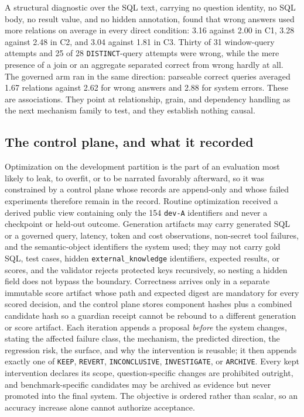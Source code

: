 A structural diagnostic over the SQL text, carrying no question identity, no SQL
body, no result value, and no hidden annotation, found that wrong answers used
more relations on average in every direct condition: 3.16 against 2.00 in C1,
3.28 against 2.48 in C2, and 3.04 against 1.81 in C3. Thirty of 31 window-query
attempts and 25 of 28 \texttt{DISTINCT}-query attempts were wrong, while the mere
presence of a join or an aggregate separated correct from wrong hardly at all.
The governed arm ran in the same direction: parseable correct queries averaged
1.67 relations against 2.62 for wrong answers and 2.88 for system errors. These
are associations. They point at relationship, grain, and dependency handling as
the next mechanism family to test, and they establish nothing causal.

\subsection{The control plane, and what it recorded}

Optimization on the development partition is the part of an evaluation most
likely to leak, to overfit, or to be narrated favorably afterward, so it was
constrained by a control plane whose records are append-only and whose failed
experiments therefore remain in the record. Routine optimization received a
derived public view containing only the 154 \texttt{dev-A} identifiers and never a
checkpoint or held-out outcome. Generation artifacts may carry generated SQL or a
governed query, latency, token and cost observations, non-secret tool failures,
and the semantic-object identifiers the system used; they may not carry gold SQL,
test cases, hidden \texttt{external\_knowledge} identifiers, expected results, or
scores, and the validator rejects protected keys recursively, so nesting a hidden
field does not bypass the boundary. Correctness arrives only in a separate
immutable score artifact whose path and expected digest are mandatory for every
scored decision, and the control plane stores component hashes plus a combined
candidate hash so a guardian receipt cannot be rebound to a different generation
or score artifact. Each iteration appends a proposal \emph{before} the system
changes, stating the affected failure class, the mechanism, the predicted
direction, the regression risk, the surface, and why the intervention is
reusable; it then appends exactly one of \texttt{KEEP}, \texttt{REVERT},
\texttt{INCONCLUSIVE}, \texttt{INVESTIGATE}, or \texttt{ARCHIVE}. Every kept
intervention declares its scope, question-specific changes are prohibited
outright, and benchmark-specific candidates may be archived as evidence but never
promoted into the final system. The objective is ordered rather than scalar, so
an accuracy increase alone cannot authorize acceptance.

